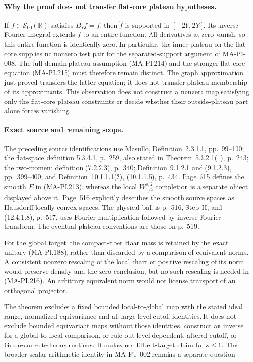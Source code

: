 \paragraph{Why the proof does not transfer flat-core plateau hypotheses.}
If \(f\in\mathcal S_{00}(\mathbb R)\) satisfies \(B_Yf=f\),
then \(\widehat f\) is supported in \([-2Y,2Y]\).
Its inverse Fourier integral extends \(f\) to an entire
function.  All derivatives at zero vanish, so this entire
function is identically zero.  In particular, the inner
plateau on the flat core supplies no nonzero test pair
for the separated-support argument of MA-PI-008.
The full-domain plateau assumption (MA-PI.214) and the
stronger flat-core equation (MA-PI.215) must therefore
remain distinct.  The graph approximation just proved
transfers the latter equation; it does not transfer
plateau membership of its approximants.
This observation does not construct a nonzero map satisfying
only the flat-core plateau constraints or decide whether
their outside-plateau part alone forces vanishing.

\paragraph{Exact source and remaining scope.}
The preceding source identifications use Masullo,
Definition~2.3.1.1, pp.~99--100; the flat-space definition
5.3.4.1, p.~259, also stated in Theorem~5.3.2.1(1), p.~243;
the two-moment definition (7.2.2.3), p.~340;
Definition~9.1.2.1 and (9.1.2.3), pp.~399--400; and
Definition~10.1.1.1(2), (10.1.1.5), p.~434.
Page~515 defines the smooth \(E\) in (MA-PI.213), whereas
the local \(W_{1/2}^{s,2}\) completion is a separate object
displayed above it.  Page~516 explicitly describes the
smooth source spaces as Hausdorff locally convex spaces.
The physical ball is p.~516, Step~II, and (12.4.1.8),
p.~517, uses Fourier multiplication followed by inverse
Fourier transform.  The eventual plateau conventions are
those on p.~519.

For the global target, the compact-fiber Haar mass is
retained by the exact unitary (MA-PI.188), rather than
discarded by a comparison of equivalent norms.
A consistent nonzero rescaling of the local chart or
positive rescaling of its norm would preserve density
and the zero conclusion, but no such rescaling is needed
in (MA-PI.216).  An arbitrary equivalent norm would not
license transport of an orthogonal projector.

The theorem excludes a fixed bounded local-to-global map
with the stated ideal range, normalized equivariance and
all-large-level cutoff identities.  It does not exclude
bounded equivariant maps without those identities,
construct an inverse for a global-to-local comparison,
or rule out level-dependent, altered-cutoff, or
Gram-corrected constructions.  It makes no Hilbert-target
claim for \(s\le1\).  The broader scalar arithmetic identity
in MA-FT-002 remains a separate question.


